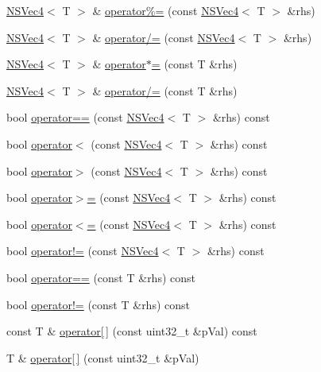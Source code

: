 \begin{DoxyCompactItemize}
\item 
\hyperlink{structNSVec4}{N\-S\-Vec4}$<$ T $>$ \& \hyperlink{structNSVec4_a9931069b959a7859d9f85404dd4c4939}{operator\%=} (const \hyperlink{structNSVec4}{N\-S\-Vec4}$<$ T $>$ \&rhs)
\item 
\hyperlink{structNSVec4}{N\-S\-Vec4}$<$ T $>$ \& \hyperlink{structNSVec4_a02916ab3e4f4c9d5077f2d0941967aef}{operator/=} (const \hyperlink{structNSVec4}{N\-S\-Vec4}$<$ T $>$ \&rhs)
\item 
\hyperlink{structNSVec4}{N\-S\-Vec4}$<$ T $>$ \& \hyperlink{structNSVec4_ad601a8c93a944a8f9c7305145bb8e17c}{operator$\ast$=} (const T \&rhs)
\item 
\hyperlink{structNSVec4}{N\-S\-Vec4}$<$ T $>$ \& \hyperlink{structNSVec4_aaef8cd1dcf9ecf14a01dd76496c18c9a}{operator/=} (const T \&rhs)
\item 
bool \hyperlink{structNSVec4_a5afb37978aa4a6010ac6d8cf3f7f0f11}{operator==} (const \hyperlink{structNSVec4}{N\-S\-Vec4}$<$ T $>$ \&rhs) const 
\item 
bool \hyperlink{structNSVec4_a44be5a58afe1ee1e7ebb2ec9ca1c2203}{operator$<$} (const \hyperlink{structNSVec4}{N\-S\-Vec4}$<$ T $>$ \&rhs) const 
\item 
bool \hyperlink{structNSVec4_a8f611bf335bf7b28a63c3fc81573bb81}{operator$>$} (const \hyperlink{structNSVec4}{N\-S\-Vec4}$<$ T $>$ \&rhs) const 
\item 
bool \hyperlink{structNSVec4_a889a4d36d2918d5e610bad18cb4b199f}{operator$>$=} (const \hyperlink{structNSVec4}{N\-S\-Vec4}$<$ T $>$ \&rhs) const 
\item 
bool \hyperlink{structNSVec4_ad193979465668f1b53bf740fe7c9599d}{operator$<$=} (const \hyperlink{structNSVec4}{N\-S\-Vec4}$<$ T $>$ \&rhs) const 
\item 
bool \hyperlink{structNSVec4_ae977d90048bc1093758396cf3608bdf4}{operator!=} (const \hyperlink{structNSVec4}{N\-S\-Vec4}$<$ T $>$ \&rhs) const 
\item 
bool \hyperlink{structNSVec4_a0810632adcef0ed4ae7d8f42a6a4d193}{operator==} (const T \&rhs) const 
\item 
bool \hyperlink{structNSVec4_a5a11b88d4dee4db4491c7b7995f77857}{operator!=} (const T \&rhs) const 
\item 
const T \& \hyperlink{structNSVec4_a735216702d9946fa80c6e3c5f897ba53}{operator\mbox{[}$\,$\mbox{]}} (const uint32\-\_\-t \&p\-Val) const 
\item 
T \& \hyperlink{structNSVec4_a389a68c34212bb89cc05d3393e149623}{operator\mbox{[}$\,$\mbox{]}} (const uint32\-\_\-t \&p\-Val)

\end{DoxyCompactItemize}
